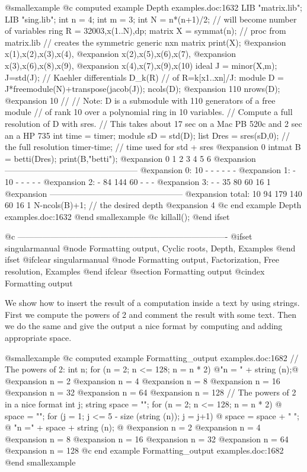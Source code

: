 @smallexample
@c computed example Depth examples.doc:1632 
  LIB "matrix.lib"; LIB "sing.lib";
  int n = 4;
  int m = 3;
  int N = n*(n+1)/2;           // will become number of variables
  ring R = 32003,x(1..N),dp;
  matrix X = symmat(n);        // proc from matrix.lib
                               // creates the symmetric generic nxn matrix
  print(X);
@expansion{} x(1),x(2),x(3),x(4),
@expansion{} x(2),x(5),x(6),x(7),
@expansion{} x(3),x(6),x(8),x(9),
@expansion{} x(4),x(7),x(9),x(10)
  ideal J = minor(X,m);
  J=std(J);
  // Kaehler differentials D_k(R)
  // of R=k[x1..xn]/J:
  module D = J*freemodule(N)+transpose(jacob(J));
  ncols(D);
@expansion{} 110
  nrows(D);
@expansion{} 10
  //
  // Note: D is a submodule with 110 generators of a free module
  // of rank 10 over a polynomial ring in 10 variables.
  // Compute a full resolution of D with sres.
  // This takes about 17 sec on a Mac PB 520c and 2 sec an a HP 735
  int time = timer;
  module sD = std(D);
  list Dres = sres(sD,0);                // the full resolution
  timer-time;                            // time used for std + sres
@expansion{} 0
  intmat B = betti(Dres);
  print(B,"betti");
@expansion{}            0     1     2     3     4     5     6
@expansion{} ------------------------------------------------
@expansion{}     0:    10     -     -     -     -     -     -
@expansion{}     1:     -    10     -     -     -     -     -
@expansion{}     2:     -    84   144    60     -     -     -
@expansion{}     3:     -     -    35    80    60    16     1
@expansion{} ------------------------------------------------
@expansion{} total:    10    94   179   140    60    16     1
  N-ncols(B)+1;                          // the desired depth
@expansion{} 4
@c end example Depth examples.doc:1632
@end smallexample
@c  killall();
@end ifset

@c ----------------------------------------------------------------------------
@ifset singularmanual
@node Formatting output, Cyclic roots, Depth, Examples
@end ifset
@ifclear singularmanual
@node Formatting output, Factorization, Free resolution, Examples
@end ifclear
@section Formatting output
@cindex Formatting output

We show how to insert the result of a computation inside a text
by using strings.
First we compute the powers of 2 and comment the result with some text.
Then we do the same and give the output a nice format by computing and
adding appropriate space.

@smallexample
@c computed example Formatting_output examples.doc:1682 
  // The powers of 2:
  int  n;
  for (n = 2; n <= 128; n = n * 2)
  @{"n = " + string (n);@}
@expansion{} n = 2
@expansion{} n = 4
@expansion{} n = 8
@expansion{} n = 16
@expansion{} n = 32
@expansion{} n = 64
@expansion{} n = 128
  // The powers of 2 in a nice format
  int j;
  string space = "";
  for (n = 2; n <= 128; n = n * 2)
  @{
    space = "";
    for (j = 1; j <= 5 - size (string (n)); j = j+1)
    @{ space = space + " "; @}
    "n =" + space + string (n);
  @}
@expansion{} n =    2
@expansion{} n =    4
@expansion{} n =    8
@expansion{} n =   16
@expansion{} n =   32
@expansion{} n =   64
@expansion{} n =  128
@c end example Formatting_output examples.doc:1682
@end smallexample

